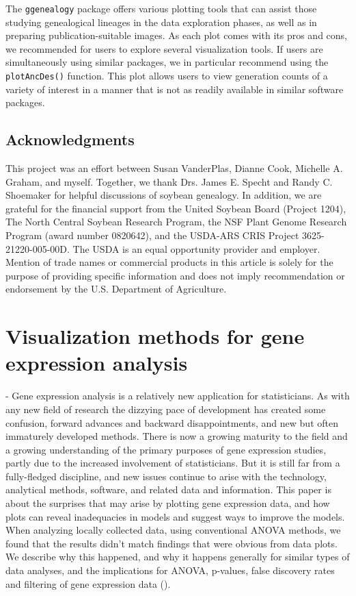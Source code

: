\documentclass[11pt,a4paper,oldfontcommands,openany]{memoir}
\numberwithin{equation}{section} %
\newcommand{\code}[1]{{\texttt{#1}}}
\newcommand{\pkg}[1]{{\texttt{#1}}}
\begin{document}
The \pkg{ggenealogy} package offers various plotting tools that can assist those studying genealogical lineages in the data exploration phases, as well as in preparing publication-suitable images. As each plot comes with its pros and cons, we recommended for users to explore several visualization tools. If users are simultaneously using similar packages, we in particular recommend using the \code{plotAncDes()} function. This plot allows users to view generation counts of a variety of interest in a manner that is not as readily available in similar software packages.

\section{Acknowledgments}

This project was an effort between Susan VanderPlas, Dianne Cook, Michelle A. Graham, and myself. Together, we  thank Drs. James E. Specht and Randy C. Shoemaker for helpful discussions of soybean genealogy. In addition, we are grateful for the financial support from the United Soybean Board (Project 1204), The North Central Soybean Research Program, the NSF Plant Genome Research Program (award number 0820642), and the USDA-ARS CRIS Project 3625-21220-005-00D. The USDA is an equal opportunity provider and employer. Mention of trade names or commercial products in this article is solely for the purpose of providing specific information and does not imply recommendation or endorsement by the U.S. Department of Agriculture.

\chapter{Visualization methods for gene expression analysis}

- Gene expression analysis is a relatively new application for statisticians. As with any new field of research the dizzying pace of development has created some confusion, forward advances and backward disappointments, and new but often immaturely developed methods. There is now a growing maturity to the field and a growing understanding of the primary purposes of gene expression studies, partly due to the increased involvement of statisticians. But it is still far from a fully-fledged discipline, and new issues continue to arise with the technology, analytical methods, software, and related data and information. This paper is about the surprises that may arise by plotting gene expression data, and how plots can reveal inadequacies in models and suggest ways to improve the models. When analyzing locally collected data, using conventional ANOVA methods, we found that the results didn’t match findings that were obvious from data plots. We describe why this happened, and why it happens generally for similar types of data analyses, and the implications for ANOVA, p-values, false discovery rates and filtering of gene expression data (\citealt{jds}).
\end{document}
